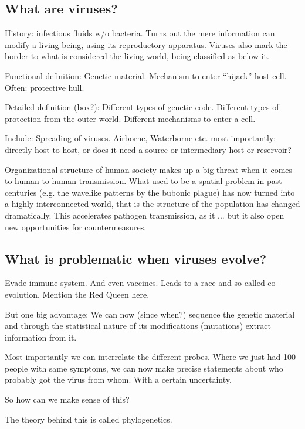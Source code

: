\documentclass[12pt]{scrartcl}
\begin{document}
    \subsection{What are viruses?}

    History: infectious fluids w/o bacteria. Turns out the mere information can modify a living being, using its reproductory apparatus. Viruses also mark the border to what is considered the living world, being classified as below it.

    Functional definition: Genetic material. Mechanism to enter ``hijack'' host cell. Often: protective hull.

    Detailed definition (box?): Different types of genetic code. Different types of protection from the outer world. Different mechanisms to enter a cell.

    Include: Spreading of viruses. Airborne, Waterborne etc. most importantly: directly host-to-host, or does it need a source or intermediary host or reservoir?

    Organizational structure of human society makes up a big threat when it comes to human-to-human transmission. What used to be a spatial problem in past centuries (e.g. the wavelike patterns by the bubonic plague) has now turned into a highly interconnected world, that is the structure of the population has changed dramatically. This accelerates pathogen transmission, as it ... but it also open new opportunities for countermeasures.

    \subsection{What is problematic when viruses evolve?}

    Evade immune system. And even vaccines. Leads to a race and so called co-evolution. Mention the Red Queen here.

    But one big advantage: We can now (since when?) sequence the genetic material and through the statistical nature of its modifications (mutations) extract information from it.

    Most importantly we can interrelate the different probes. Where we just had 100 people with same symptoms, we can now make precise statements about who probably got the virus from whom. With a certain uncertainty.

    So how can we make sense of this?

    The theory behind this is called phylogenetics.
\end{document}
